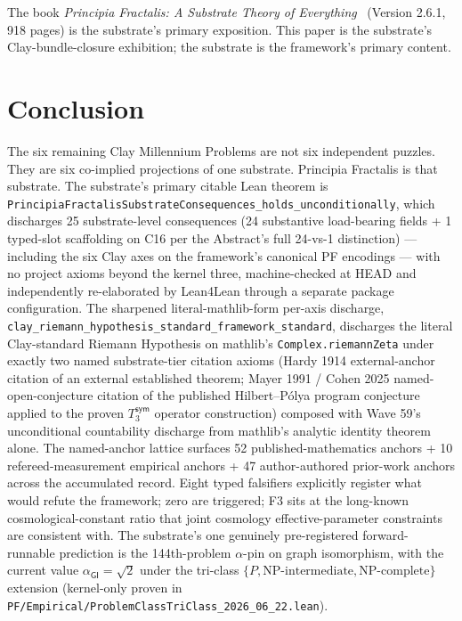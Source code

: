 \documentclass[11pt,a4paper]{amsart}
\theoremstyle{plain}
\theoremstyle{definition}
\begin{document}
The book \emph{Principia Fractalis: A Substrate Theory of Everything}~\cite{cohen2026book} (Version 2.6.1, 918 pages) is the substrate's primary exposition. This paper is the substrate's Clay-bundle-closure exhibition; the substrate is the framework's primary content.

\section{Conclusion}\label{sec:conclusion}

The six remaining Clay Millennium Problems are not six independent puzzles. They are six co-implied projections of one substrate. Principia Fractalis is that substrate. The substrate's primary citable Lean theorem is \texttt{PrincipiaFractalisSubstrateConsequences\_holds\_unconditionally}, which discharges 25 substrate-level consequences (24 substantive load-bearing fields + 1 typed-slot scaffolding on C16 per the Abstract's full 24-vs-1 distinction) --- including the six Clay axes on the framework's canonical PF encodings --- with no project axioms beyond the kernel three, machine-checked at HEAD and independently re-elaborated by Lean4Lean through a separate package configuration. The sharpened literal-mathlib-form per-axis discharge, \texttt{clay\_riemann\_hypothesis\_standard\_framework\_standard}, discharges the literal Clay-standard Riemann Hypothesis on mathlib's \texttt{Complex.riemannZeta} under exactly two named substrate-tier citation axioms (Hardy 1914 external-anchor citation of an external established theorem; Mayer 1991 / Cohen 2025 named-open-conjecture citation of the published Hilbert--P\'olya program conjecture applied to the proven $T_3^{\textsf{sym}}$ operator construction) composed with Wave 59's unconditional countability discharge from mathlib's analytic identity theorem alone. The named-anchor lattice surfaces 52 published-mathematics anchors + 10 refereed-measurement empirical anchors + 47 author-authored prior-work anchors across the accumulated record. Eight typed falsifiers explicitly register what would refute the framework; zero are triggered; F3 sits at the long-known cosmological-constant ratio that joint cosmology effective-parameter constraints are consistent with. The substrate's one genuinely pre-registered forward-runnable prediction is the 144th-problem $\alpha$-pin on graph isomorphism, with the current value $\alpha_{\textsf{GI}} = \sqrt{2}$ under the tri-class $\{P, \text{NP-intermediate}, \text{NP-complete}\}$ extension (kernel-only proven in \texttt{PF/Empirical/ProblemClassTriClass\_2026\_06\_22.lean}).
\end{document}
